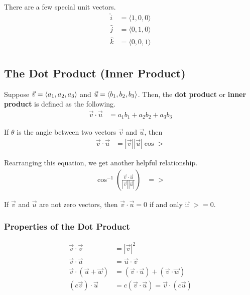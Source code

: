 \begin{notation}
There are a few special unit vectors.
    \begin{align*}
        \hat{i} &= \langle 1, 0, 0 \rangle \\
        \hat{j} &= \langle 0, 1, 0 \rangle \\
        \hat{k} &= \langle 0, 0, 1 \rangle \\
    \end{align*}
\end{notation}

\subsection{The Dot Product (Inner Product)}
\begin{definition}
    Suppose $\vec{v} = \langle a_1, a_2, a_3 \rangle$ and $\vec{u} = \langle b_1, b_2, b_3 \rangle$. Then, the \textbf{dot product} or \textbf{inner product} is defined
    as the following.
    \begin{align*}
        \vec{v} \cdot \vec{u} &= a_1 b_1 + a_2 b_2 + a_3 b_3
    \end{align*}
\end{definition}

\begin{thm}
    If $\theta$ is the angle between two vectors $\vec{v}$ and $\vec{u}$, then 
    \begin{align*}
        \vec{v} \cdot \vec{u} &= |\vec{v}| |\vec{u}| \cos \gt
    \end{align*}

    Rearranging this equation, we get another helpful relationship.
    \begin{align*}
        \cos^{-1} \left( \frac{\vec{v} \cdot \vec{u}}{|\vec{v}| |\vec{u}|} \right) &= \gt
    \end{align*}
\end{thm}

\begin{corollary}
    If $\vec{v}$ and $\vec{u}$ are not zero vectors, then $\vec{v} \cdot \vec{u} = 0$ if and only if $\gt = 0$.
\end{corollary}

\subsubsection{Properties of the Dot Product}
\begin{align*}
    \vec{v} \cdot \vec{v} &= | \vec{v} |^2 \\
    \vec{v} \cdot \vec{u} &= \vec{u} \cdot \vec{v} \\
    \vec{v} \cdot (\vec{u} + \vec{w}) &= (\vec{v} \cdot \vec{u}) + (\vec{v} \cdot \vec{w}) \\
    (c \vec{v}) \cdot \vec{u} &= c(\vec{v} \cdot \vec{u}) = \vec{v} \cdot (c \vec{u}) 
\end{align*}

